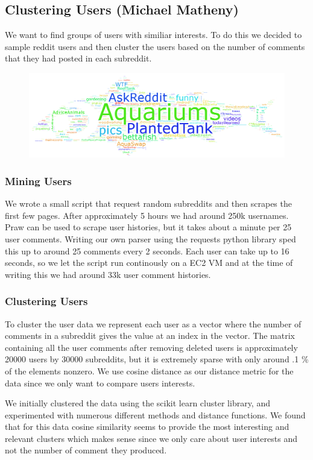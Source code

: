 \documentclass[12pt]{article}
\numberwithin{equation}{section}
\begin{document}
\subsection*{Clustering Users (Michael Matheny)}
We want to find groups of users with similiar interests. To do this we decided to sample reddit users and then cluster the users based on the number of comments that they had posted in each subreddit. 
\begin{figure}[h!]
	\includegraphics[scale=.4]{fish_94.png}
\end{figure}

\subsubsection*{Mining Users}
 We wrote a small script that request random subreddits and then scrapes the first few pages. After approximately 5 hours we had around 250k usernames. Praw can be used to scrape user histories, but it takes about a minute per 25 user comments. 
 Writing our own parser using the requests python library sped this up to around 25 comments every 2 seconds. Each user can take up to 16 seconds, so we let the script run continously on a EC2 VM and at the time of writing this we had 
 around 33k user comment histories. 
\subsubsection*{Clustering Users}
To cluster the user data we represent each user as a vector where the number of comments in a subreddit gives 
the value at an index in the vector. The matrix containing all the user comments after removing 
deleted users is approximately 20000 users by 30000 subreddits, but it is extremely sparse with only around .1 \%
of the elements nonzero. 
We use cosine distance as our distance metric for the data since we only want to compare users interests. 

We initially clustered the data using the scikit learn cluster library, and experimented with numerous different 
methods and distance functions. We found that for this data cosine similarity seems to provide the most interesting 
and relevant clusters which makes sense since we only care about user interests and not the number of comment
they produced.
\end{document}

